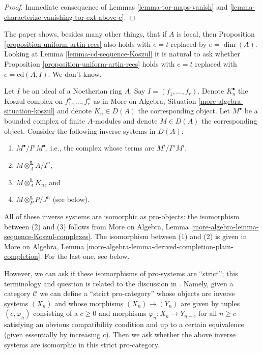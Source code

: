 \begin{proof}
Immediate consequence of Lemmas
\ref{lemma-tor-maps-vanish} and
\ref{lemma-characterize-vanishing-tor-ext-above-e}.
\end{proof}

\begin{remark}
\label{remark-better-bound}
The paper \cite{AHS} shows, besides many other things, that if $A$ is local,
then Proposition \ref{proposition-uniform-artin-rees} also holds
with $e = t$ replaced by $e = \dim(A)$. Looking at
Lemma \ref{lemma-cd-sequence-Koszul} it is natural to ask whether
Proposition \ref{proposition-uniform-artin-rees}
holds with $e = t$ replaced with $e = \text{cd}(A, I)$. We don't know.
\end{remark}

\begin{remark}
\label{remark-strict-pro-isomorphism}
Let $I$ be an ideal of a Noetherian ring $A$. Say $I = (f_1, \ldots, f_r)$.
Denote $K_n^\bullet$ the Koszul complex on $f_1^n, \ldots, f_r^n$ as in
More on Algebra, Situation \ref{more-algebra-situation-koszul} and
denote $K_n \in D(A)$ the corresponding object.
Let $M^\bullet$ be a bounded complex of finite $A$-modules
and denote $M \in D(A)$ the corresponding object.
Consider the following inverse systems in $D(A)$:
\begin{enumerate}
\item $M^\bullet/I^nM^\bullet$, i.e., the complex whose terms are $M^i/I^nM^i$,
\item $M \otimes_A^\mathbf{L} A/I^n$,
\item $M \otimes_A^\mathbf{L} K_n$, and
\item $M \otimes_P^\mathbf{L} P/J^n$ (see below).
\end{enumerate}
All of these inverse systems are isomorphic as pro-objects:
the isomorphism between (2) and (3) follows from
More on Algebra, Lemma \ref{more-algebra-lemma-sequence-Koszul-complexes}.
The isomorphism between (1) and (2) is given in
More on Algebra, Lemma
\ref{more-algebra-lemma-derived-completion-plain-completion}.
For the last one, see below.

\medskip\noindent
However, we can ask if these isomorphisms of pro-systems are ``strict'';
this terminology and question is related to the discussion in
\cite[pages 61, 62]{quillenhomology}. Namely, given a category $\mathcal{C}$
we can define a ``strict pro-category'' whose objects are inverse systems
$(X_n)$ and whose morphisms $(X_n) \to (Y_n)$ are given by tuples
$(c, \varphi_n)$ consisting of a $c \geq 0$ and morphisms
$\varphi_n : X_n \to Y_{n - c}$ for all $n \geq c$ satisfying
an obvious compatibility condition and up to a certain equivalence
(given essentially by increasing $c$). Then we ask whether the above
inverse systems are isomorphic in this strict pro-category.


\end{remark}

